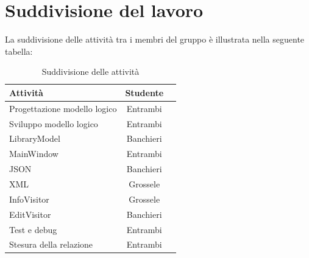 \documentclass[a4paper,10pt]{article}
\begin{document}
\section{Suddivisione del lavoro}
La suddivisione delle attività tra i membri del gruppo è illustrata nella seguente tabella:

\begin{table}[H]
\centering
\begin{tabular}{|l|c|r|}
  \hline
  Attività & Studente \\ \hline
  Progettazione modello logico & Entrambi \\
  Sviluppo modello logico & Entrambi \\
  LibraryModel & Banchieri \\
  MainWindow & Entrambi \\
  JSON & Banchieri \\ 
  XML & Grossele \\ 
  InfoVisitor & Grossele \\
  EditVisitor & Banchieri \\
  Test e debug & Entrambi \\ 
  Stesura della relazione & Entrambi\\ \hline
\end{tabular}
\caption{Suddivisione delle attività}
\label{tab:esempio}
\end{table}
\end{document}
